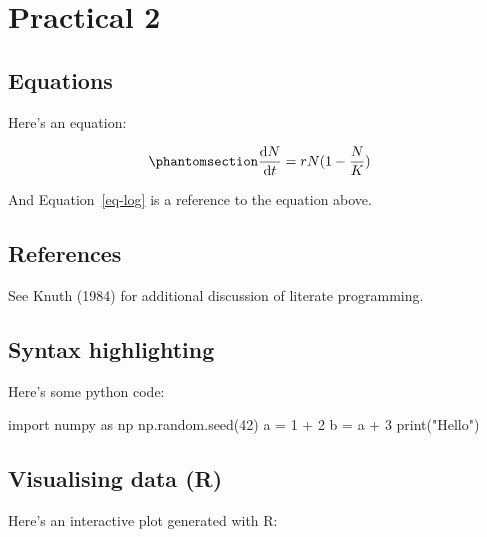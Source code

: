 \documentclass[
  letterpaper,
  DIV=11,
  numbers=noendperiod]{scrreprt}
\newenvironment{Shaded}{\begin{snugshade}}{\end{snugshade}}
\newcommand{\BuiltInTok}[1]{\textcolor[rgb]{0.00,0.23,0.31}{#1}}
\newcommand{\DecValTok}[1]{\textcolor[rgb]{0.68,0.00,0.00}{#1}}
\newcommand{\ImportTok}[1]{\textcolor[rgb]{0.00,0.46,0.62}{#1}}
\newcommand{\NormalTok}[1]{\textcolor[rgb]{0.00,0.23,0.31}{#1}}
\newcommand{\OperatorTok}[1]{\textcolor[rgb]{0.37,0.37,0.37}{#1}}
\newcommand{\StringTok}[1]{\textcolor[rgb]{0.13,0.47,0.30}{#1}}
\theoremstyle{definition}
\theoremstyle{remark}
\begin{document}
\chapter{Practical 2}\label{practical-2-1}

\section{Equations}\label{equations-7}

Here's an equation:

\begin{equation}\phantomsection\label{eq-log}{ 
\frac{\mathrm{d}N}{\mathrm{d}t} = rN(1 - \frac{N}{K}) 
}\end{equation}

And Equation~\ref{eq-log} is a reference to the equation above.

\section{References}\label{references-7}

See Knuth (1984) for additional discussion of literate programming.

\section{Syntax highlighting}\label{syntax-highlighting-7}

Here's some python code:

\begin{Shaded}
\begin{Highlighting}[]
\ImportTok{import}\NormalTok{ numpy }\ImportTok{as}\NormalTok{ np}
\NormalTok{np.random.seed(}\DecValTok{42}\NormalTok{)}
\NormalTok{a }\OperatorTok{=} \DecValTok{1} \OperatorTok{+} \DecValTok{2}
\NormalTok{b }\OperatorTok{=}\NormalTok{ a }\OperatorTok{+} \DecValTok{3}
\BuiltInTok{print}\NormalTok{(}\StringTok{"Hello"}\NormalTok{)}
\end{Highlighting}
\end{Shaded}

\section{Visualising data (R)}\label{visualising-data-r-7}

Here's an interactive plot generated with R:
\end{document}
